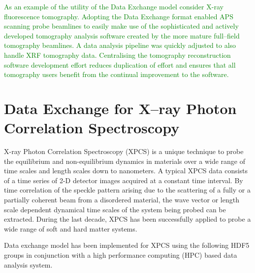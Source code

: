 \documentclass[pdf]{iucr}              %
\begin{document}
\textcolor{green}{As an example of the utility of the Data Exchange model consider X-ray fluorescence tomography. Adopting the Data Exchange format enabled APS scanning probe beamlines to easily make use of the sophisticated and actively developed tomography analysis software created by the more mature full--field tomography beamlines. A data analysis pipeline was quickly adjusted to also handle XRF tomography data. Centralising the tomography reconstruction \textcolor{green}{software} development effort reduces duplication of effort and ensures that all tomography users benefit from the continual improvement to the software.}

\section{Data Exchange for X--ray Photon Correlation Spectroscopy}

X-ray Photon Correlation Spectroscopy (XPCS) is a unique technique to probe the equilibrium and non-equilibrium dynamics in materials over a wide range of time scales and length scales down to nanometers. A typical XPCS data consists of a time series of 2-D detector images acquired at a constant time interval. By time correlation of the speckle pattern arising due to the scattering of a fully or a partially coherent beam from a disordered material, the wave vector or length scale dependent dynamical time scales of the system being probed can be extracted. During the last decade, XPCS has been successfully applied to probe a wide range of soft and hard matter systems.

Data exchange model has been implemented for XPCS using the following HDF5 groups in conjunction with a high performance computing (HPC) based data analysis system.
\end{document}
